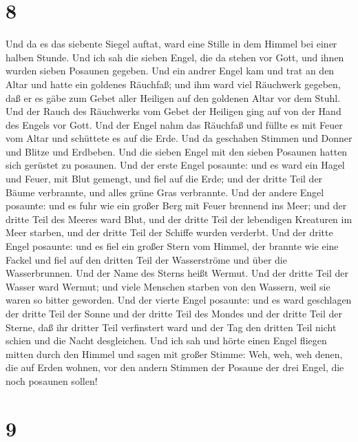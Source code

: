 \hypertarget{section-7}{%
\section{8}\label{section-7}}

 Und da es das siebente Siegel auftat, ward eine Stille in
dem Himmel bei einer halben Stunde.  Und ich sah die sieben
Engel, die da stehen vor Gott, und ihnen wurden sieben Posaunen gegeben.
 Und ein andrer Engel kam und trat an den Altar und hatte
ein goldenes Räuchfaß; und ihm ward viel Räuchwerk gegeben, daß er es
gäbe zum Gebet aller Heiligen auf den goldenen Altar vor dem Stuhl.
 Und der Rauch des Räuchwerks vom Gebet der Heiligen ging
auf von der Hand des Engels vor Gott.  Und der Engel nahm
das Räuchfaß und füllte es mit Feuer vom Altar und schüttete es auf die
Erde. Und da geschahen Stimmen und Donner und Blitze und Erdbeben.
 Und die sieben Engel mit den sieben Posaunen hatten sich
gerüstet zu posaunen.  Und der erste Engel posaunte: und es
ward ein Hagel und Feuer, mit Blut gemengt, und fiel auf die Erde; und
der dritte Teil der Bäume verbrannte, und alles grüne Gras verbrannte.
 Und der andere Engel posaunte: und es fuhr wie ein großer
Berg mit Feuer brennend ins Meer; und der dritte Teil des Meeres ward
Blut,  und der dritte Teil der lebendigen Kreaturen im Meer
starben, und der dritte Teil der Schiffe wurden verderbt. 
Und der dritte Engel posaunte: und es fiel ein großer Stern vom Himmel,
der brannte wie eine Fackel und fiel auf den dritten Teil der
Wasserströme und über die Wasserbrunnen.  Und der Name des
Sterns heißt Wermut. Und der dritte Teil der Wasser ward Wermut; und
viele Menschen starben von den Wassern, weil sie waren so bitter
geworden.  Und der vierte Engel posaunte: und es ward
geschlagen der dritte Teil der Sonne und der dritte Teil des Mondes und
der dritte Teil der Sterne, daß ihr dritter Teil verfinstert ward und
der Tag den dritten Teil nicht schien und die Nacht desgleichen.
 Und ich sah und hörte einen Engel fliegen mitten durch den
Himmel und sagen mit großer Stimme: Weh, weh, weh denen, die auf Erden
wohnen, vor den andern Stimmen der Posaune der drei Engel, die noch
posaunen sollen!

\hypertarget{section-8}{%
\section{9}\label{section-8}}

